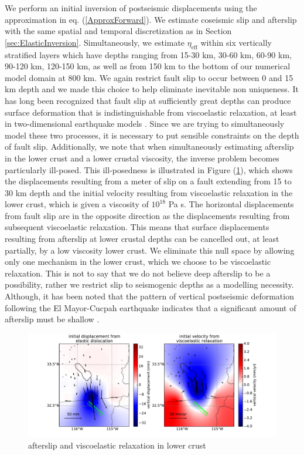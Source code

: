 \documentclass[review]{elsarticle}
\begin{document}
We perform an initial inversion of postseismic displacements using the approximation in eq. (\ref{ApproxForward}).  We estimate coseismic slip and afterslip with the same spatial and temporal discretization as in Section \ref{sec:ElasticInversion}. Simultaneously, we estimate $\eta_{\mathrm{eff}}$ within six vertically stratified layers which have depths ranging from 15-30 km, 30-60 km, 60-90 km, 90-120 km, 120-150 km, as well as from 150 km to the bottom of our numerical model domain at 800 km.  We again restrict fault slip to occur between 0 and 15 km depth and we made this choice to help eliminate inevitable non uniqueness.  It has long been recognized that fault slip at sufficiently great depths can produce surface deformation that is indistinguishable from viscoelastic relaxation, at least in two-dimensional earthquake models \citep{Savage1990}. Since we are trying to simultaneously model these two processes, it is necessary to put sensible constraints on the depth of fault slip.  Additionally, we note that when simultaneously estimating afterslip in the lower crust and a lower crustal viscosity, the inverse problem becomes particularly ill-posed. This ill-posedness is illustrated in Figure (\ref{fig:LowerCrust}), which shows the displacements resulting from a meter of slip on a fault extending from 15 to 30 km depth and the initial velocity resulting from viscoelastic relaxation in the lower crust, which is given a viscosity of $10^{18}$ Pa s.  The horizontal displacements from fault slip are in the opposite direction as the displacements resulting from subsequent viscoelastic relaxation.  This means that surface displacements resulting from afterslip at lower crustal depths can be cancelled out, at least partially, by a low viscosity lower crust.  We eliminate this null space by allowing only one mechanism in the lower crust, which we choose to be viscoelastic relaxation.  This is not to say that we do not believe deep afterslip to be a possibility, rather we restrict slip to seismogenic depths as a modelling necessity. Although, it has been noted that the pattern of vertical postseismic deformation following the El Mayor-Cucpah earthquake indicates that a significant amount of afterslip must be shallow \citep{Rollins2015}.  
 
\begin{figure}
\includegraphics[scale=0.5]{Figures/Cancellation}
\caption{afterslip and viscoelastic relaxation in lower crust}
\label{fig:LowerCrust}
\end{figure}
 
\end{document}
